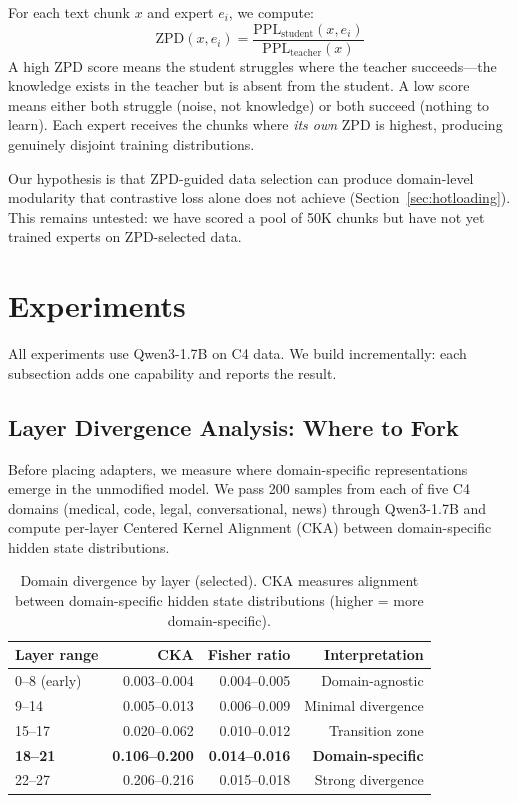 \documentclass{article}
\begin{document}
For each text chunk $x$ and expert $e_i$, we compute:
\begin{equation}
\text{ZPD}(x, e_i) = \frac{\text{PPL}_{\text{student}}(x, e_i)}{\text{PPL}_{\text{teacher}}(x)}
\label{eq:zpd}
\end{equation}
A high ZPD score means the student struggles where the teacher succeeds---the
knowledge exists in the teacher but is absent from the student. A low score
means either both struggle (noise, not knowledge) or both succeed (nothing to
learn). Each expert receives the chunks where \emph{its own} ZPD is highest,
producing genuinely disjoint training distributions.

Our hypothesis is that ZPD-guided data selection can produce domain-level
modularity that contrastive loss alone does not achieve
(Section~\ref{sec:hotloading}). This remains untested: we have scored a pool
of 50K chunks but have not yet trained experts on ZPD-selected data.

\section{Experiments}
\label{sec:experiments}

All experiments use Qwen3-1.7B on C4 data. We build incrementally: each
subsection adds one capability and reports the result.

\subsection{Layer Divergence Analysis: Where to Fork}
\label{sec:divergence}

Before placing adapters, we measure where domain-specific representations
emerge in the unmodified model. We pass 200 samples from each of five C4
domains (medical, code, legal, conversational, news) through Qwen3-1.7B and
compute per-layer Centered Kernel Alignment (CKA) between domain-specific
hidden state distributions.

\begin{table}[h]
\centering
\caption{Domain divergence by layer (selected). CKA measures alignment between
domain-specific hidden state distributions (higher = more domain-specific).}
\label{tab:divergence}
\begin{tabular}{@{}lrrr@{}}
\toprule
Layer range & CKA & Fisher ratio & Interpretation \\
\midrule
0--8 (early) & 0.003--0.004 & 0.004--0.005 & Domain-agnostic \\
9--14        & 0.005--0.013 & 0.006--0.009 & Minimal divergence \\
15--17       & 0.020--0.062 & 0.010--0.012 & Transition zone \\
\textbf{18--21} & \textbf{0.106--0.200} & \textbf{0.014--0.016} & \textbf{Domain-specific} \\
22--27       & 0.206--0.216 & 0.015--0.018 & Strong divergence \\
\bottomrule
\end{tabular}
\end{table}
\end{document}
